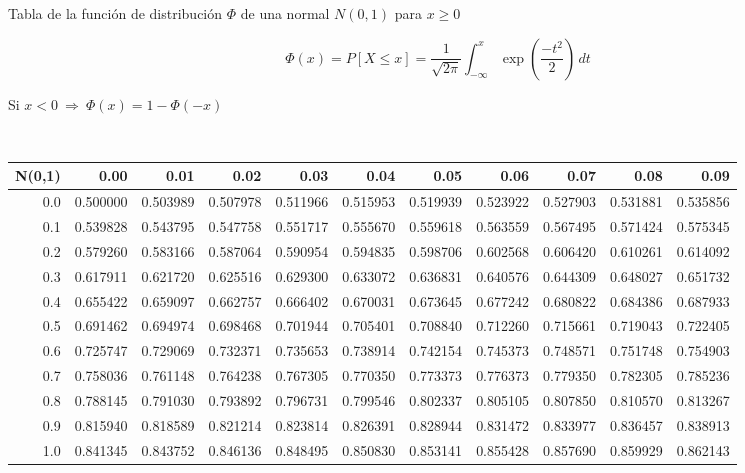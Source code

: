 \documentclass{article}
\begin{document}
\newpage

\begin{center}
Tabla de la función de distribución $\Phi$ de una normal $N(0,1)$ para $x\geq 0$

    $$
    \Phi(x)=P[X\leq x]=\frac{1}{\sqrt{2\pi}}\int_{-\infty}^x\exp\left(\frac{-t^2}{2}\right)\,dt
    $$
    
    Si $x<0\ \Rightarrow \  \Phi(x)=1-\Phi(-x)$
\end{center}

$\quad$

\begin{center}
\begin{footnotesize}
\begin{tabular}{|r|rrrrrrrrrr|}\hline
\textbf{N(0,1)} & 0.00 & 0.01 & 0.02 & 0.03 & 0.04 & 0.05 & 0.06 & 0.07 & 0.08 & 0.09 \\ \hline
0.0 & 0.500000 & 0.503989 & 0.507978 & 0.511966 & 0.515953 & 0.519939 & 0.523922 & 0.527903 & 0.531881 & 0.535856 \\
0.1 & 0.539828 & 0.543795 & 0.547758 & 0.551717 & 0.555670 & 0.559618 & 0.563559 & 0.567495 & 0.571424 & 0.575345 \\
0.2 & 0.579260 & 0.583166 & 0.587064 & 0.590954 & 0.594835 & 0.598706 & 0.602568 & 0.606420 & 0.610261 & 0.614092 \\
0.3 & 0.617911 & 0.621720 & 0.625516 & 0.629300 & 0.633072 & 0.636831 & 0.640576 & 0.644309 & 0.648027 & 0.651732 \\
0.4 & 0.655422 & 0.659097 & 0.662757 & 0.666402 & 0.670031 & 0.673645 & 0.677242 & 0.680822 & 0.684386 & 0.687933 \\
0.5 & 0.691462 & 0.694974 & 0.698468 & 0.701944 & 0.705401 & 0.708840 & 0.712260 & 0.715661 & 0.719043 & 0.722405 \\
0.6 & 0.725747 & 0.729069 & 0.732371 & 0.735653 & 0.738914 & 0.742154 & 0.745373 & 0.748571 & 0.751748 & 0.754903 \\
0.7 & 0.758036 & 0.761148 & 0.764238 & 0.767305 & 0.770350 & 0.773373 & 0.776373 & 0.779350 & 0.782305 & 0.785236 \\
0.8 & 0.788145 & 0.791030 & 0.793892 & 0.796731 & 0.799546 & 0.802337 & 0.805105 & 0.807850 & 0.810570 & 0.813267 \\
0.9 & 0.815940 & 0.818589 & 0.821214 & 0.823814 & 0.826391 & 0.828944 & 0.831472 & 0.833977 & 0.836457 & 0.838913 \\
1.0 & 0.841345 & 0.843752 & 0.846136 & 0.848495 & 0.850830 & 0.853141 & 0.855428 & 0.857690 & 0.859929 & 0.862143 \\

\end{tabular}
\end{footnotesize}
\end{center}
\end{document}
